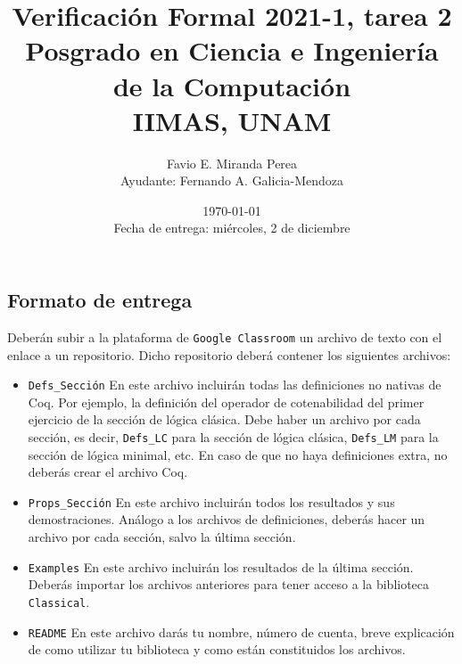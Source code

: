 \documentclass[letterpaper, 11 pt]{article}
\title{Verificación Formal 2021-1, tarea 2\\
Posgrado en Ciencia e Ingeniería de la Computación\\
IIMAS, UNAM}
\author{Favio E. Miranda Perea\\
Ayudante: Fernando A. Galicia-Mendoza}
\date{\today\\ Fecha de entrega: miércoles, 2 de diciembre}
\begin{document}
\maketitle

\subsection*{Formato de entrega}
Deberán subir a la plataforma de {\tt Google Classroom} un archivo de texto con el enlace a un repositorio. Dicho repositorio deberá  contener los siguientes archivos:
\begin{itemize}
    \item {\tt Defs\_\textlangle Sección\textrangle} En este archivo incluirán todas las definiciones no nativas de {\sf Coq}. Por ejemplo, la definición del operador de cotenabilidad del primer ejercicio de la sección de lógica clásica. Debe haber un archivo por cada sección, es decir, {\tt Defs\_LC} para la sección de lógica clásica, {\tt Defs\_LM} para la sección de lógica minimal, etc. En caso de que no haya definiciones extra, no deberás crear el archivo {\sf Coq}.
    \item {\tt Props\_\textlangle Sección\textrangle} En este archivo incluirán todos los resultados y sus demostraciones. Análogo a los archivos de definiciones, deberás hacer un archivo por cada sección, salvo la última sección.
    \item {\tt Examples} En este archivo incluirán los resultados de la última sección. Deberás importar los archivos anteriores para tener acceso a la biblioteca {\tt Classical}.
    \item {\tt README} En este archivo darás tu nombre, número de cuenta, breve explicación de como utilizar tu biblioteca y como  están constituidos los archivos.
\end{itemize}
\end{document}
